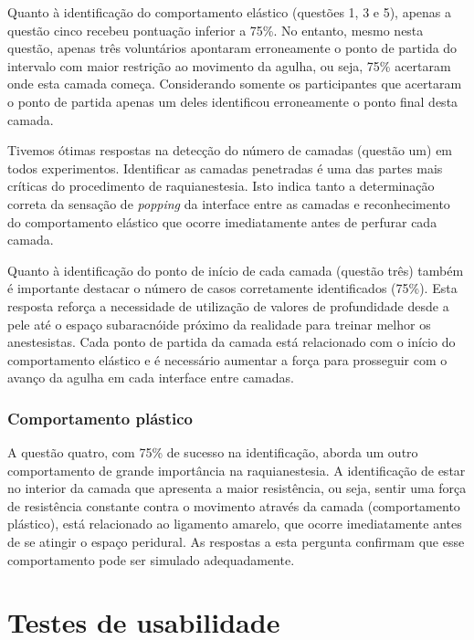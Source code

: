Quanto à identificação do comportamento elástico (questões 1, 3 e 5), apenas a questão cinco recebeu pontuação inferior a 75\%. No entanto, mesmo nesta questão, apenas três voluntários apontaram erroneamente o ponto de partida do intervalo com maior restrição ao movimento da agulha, ou seja, 75\% acertaram onde esta camada começa. Considerando somente os participantes que acertaram o ponto de partida apenas um deles identificou erroneamente o ponto final desta camada. 

Tivemos ótimas respostas na detecção do número de camadas (questão um) em todos experimentos. Identificar as camadas penetradas é uma das partes mais críticas do procedimento de raquianestesia. Isto indica tanto a determinação correta da sensação de \textit{popping} da interface entre as camadas e reconhecimento do comportamento elástico que ocorre imediatamente antes de perfurar cada camada.

Quanto à identificação do ponto de início de cada camada (questão três) também é importante destacar o número de casos corretamente identificados (75\%). Esta resposta reforça a necessidade de utilização de valores de profundidade desde a pele até o espaço subaracnóide próximo da realidade para treinar melhor os anestesistas. Cada ponto de partida da camada está relacionado com o início do comportamento elástico e é necessário aumentar a força para prosseguir com o avanço da agulha em cada interface entre camadas. 

\subsubsection{Comportamento plástico}

A questão quatro, com 75\% de sucesso na identificação, aborda um outro comportamento de grande importância na raquianestesia. A identificação de estar no interior da camada que apresenta a maior
resistência, ou seja, sentir uma força de resistência constante contra o movimento através da camada (comportamento plástico), está relacionado ao ligamento amarelo, que ocorre imediatamente antes de se atingir o espaço peridural. As respostas a esta pergunta
confirmam que esse comportamento pode ser simulado adequadamente.

\section{Testes de usabilidade}
\label{sec:testeUsabilidade}

